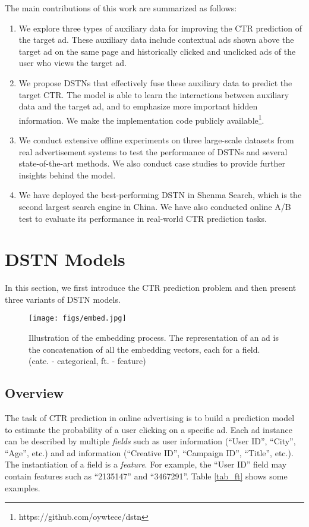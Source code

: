 \documentclass[sigconf]{acmart}
\begin{document}
The main contributions of this work are summarized as follows:
\begin{enumerate}
\item We explore three types of auxiliary data for improving the CTR prediction of the target ad. These auxiliary data include contextual ads shown above the target ad on the same page and historically clicked and unclicked ads of the user who views the target ad.
\item We propose DSTNs that effectively fuse these auxiliary data to predict the target CTR. The model is able to learn the interactions between auxiliary data and the target ad, and to emphasize more important hidden information. We make the implementation code publicly available\footnote{https://github.com/oywtece/dstn}.
\item We conduct extensive offline experiments on three large-scale datasets from real advertisement systems to test the performance of DSTNs and several state-of-the-art methods. We also conduct case studies to provide further insights behind the model.
\item We have deployed the best-performing DSTN in Shenma Search, which is the second largest search engine in China. We have also conducted online A/B test to evaluate its performance in real-world CTR prediction tasks.
\end{enumerate}

\section{DSTN Models}
In this section, we first introduce the CTR prediction problem and then present three variants of DSTN models.

\begin{figure}[!t]
\centering
\texttt{[image: figs/embed.jpg]}
\vskip -8pt
\caption{Illustration of the embedding process. The representation  of an ad is the concatenation of all the embedding vectors, each for a field. (cate. - categorical, ft. - feature)}
\vskip -12pt
\label{embed}
\end{figure}

\subsection{Overview}
The task of CTR prediction in online advertising is to build a prediction model to estimate the probability of a user clicking on a specific ad.
Each ad instance can be described by multiple \emph{fields} such as user information (``User ID'', ``City'', ``Age'', etc.) and ad information (``Creative ID'', ``Campaign ID'', ``Title'', etc.). The instantiation of a field is a \emph{feature}. For example, the ``User ID'' field may contain features such as ``2135147'' and ``3467291''. Table \ref{tab_ft} shows some examples.
\end{document}
